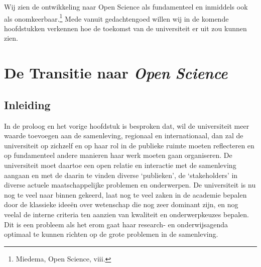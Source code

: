 \documentclass{jote-book}
\begin{document}
	Wij zien de ontwikkeling naar Open Science als fundamenteel en inmiddels ook als onomkeerbaar.\footnote{Miedema, Open Science, viii.} Mede vanuit gedachtengoed willen wij in de komende hoofdstukken verkennen hoe de toekomst van de universiteit er uit zou kunnen zien.







	\chapter{De Transitie naar \emph{Open }\emph{Science} }



















	\section{Inleiding }



	In de proloog en het vorige hoofdstuk is besproken dat, wil de universiteit meer waarde toevoegen aan de samenleving, regionaal en internationaal, dan zal de universiteit op zichzelf en op haar rol in de publieke ruimte moeten reflecteren en op fundamenteel andere manieren haar werk moeten gaan organiseren. De universiteit moet daartoe een open relatie en interactie met de samenleving aangaan en met de daarin te vinden diverse ‘publieken', de ‘stakeholders' in diverse actuele maatschappelijke problemen en onderwerpen. De universiteit is nu nog te veel naar binnen gekeerd, laat nog te veel zaken in de academie bepalen door de klassieke ideeën over wetenschap die nog zeer dominant zijn, en nog veelal de interne criteria ten aanzien van kwaliteit en onderwerpkeuzes bepalen. Dit is een probleem als het erom gaat haar research- en onderwijsagenda optimaal te kunnen richten op de grote problemen in de samenleving.
\end{document}
